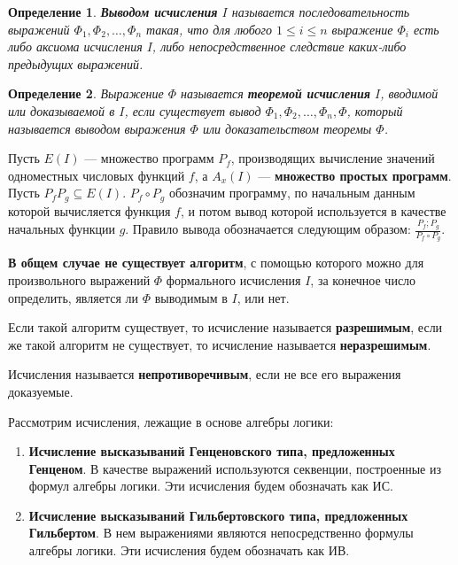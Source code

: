 \documentclass{article}
\newtheorem{definition}{Определение}
\begin{document}
\begin{definition}
\textbf{Выводом исчисления} $I$ называется последовательность выражений $\Phi_{1}, \Phi_{2}, \dots, \Phi_{n}$ такая, что для любого $1 \le i \le n$ выражение $\Phi_{i}$ есть либо аксиома исчисления $I$, либо непосредственное следствие каких-либо предыдущих выражений.
\end{definition}

\begin{definition}
Выражение $\Phi$ называется \textbf{теоремой исчисления} $I$, вводимой или доказываемой в $I$, если существует вывод $\Phi_{1}, \Phi_{2}, \dots, \Phi_{n}, \Phi$, который называется выводом выражения $\Phi$ или доказательством теоремы $\Phi$.
\end{definition}

Пусть $E(I)$ — множество программ $P_{f}$, производящих вычисление значений одноместных числовых функций $f$, а $A_{x}(I)$ — \textbf{множество простых программ}. Пусть $P_{f} P_{g} \subseteq E(I)$. $P_{f} \circ P_{g}$ обозначим программу, по начальным данным которой вычисляется функция $f$, и потом вывод которой используется в качестве начальных функции $g$. Правило вывода обозначается следующим образом: $\frac{P_{f} ; P_{g}}{P_{f} \circ P_{g}}$.

\textbf{В общем случае не существует алгоритм}, с помощью которого можно для произвольного выражений $\Phi$ формального исчисления $I$, за конечное число определить, является ли $\Phi$ выводимым в $I$, или нет.

Если такой алгоритм существует, то исчисление называется \textbf{разрешимым}, если же такой алгоритм не существует, то исчисление называется \textbf{неразрешимым}.

Исчисления называется \textbf{непротиворечивым}, если не все его выражения доказуемые.

Рассмотрим исчисления, лежащие в основе алгебры логики:

\begin{enumerate}
    \item \textbf{Исчисление высказываний Генценовского типа, предложенных Генценом}. В качестве выражений используются секвенции, построенные из формул алгебры логики. Эти исчисления будем обозначать как ИС.
    \item \textbf{Исчисление высказываний Гильбертовского типа, предложенных Гильбертом}. В нем выражениями являются непосредственно формулы алгебры логики. Эти исчисления будем обозначать как ИВ.
\end{enumerate}
\end{document}
